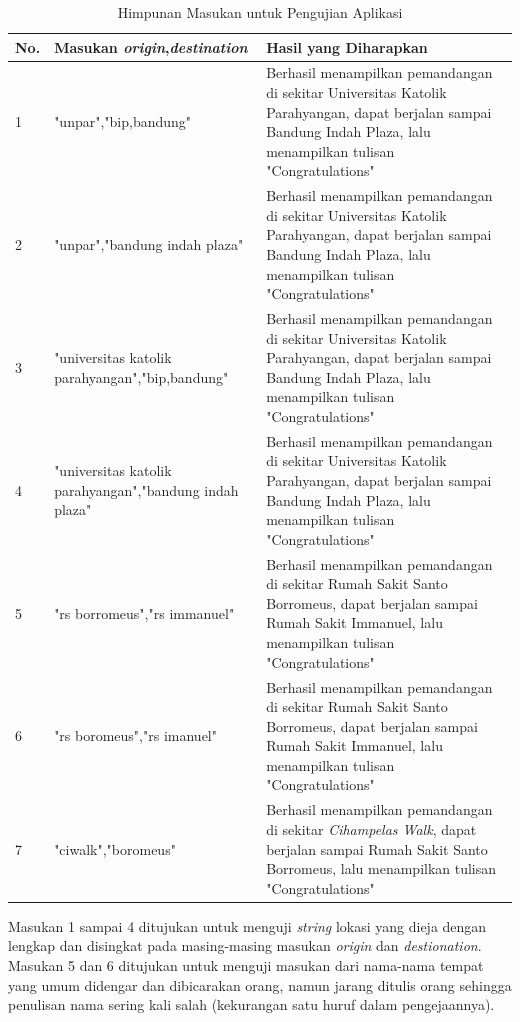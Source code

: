 \begin{table}[]
    \centering
    \caption{Himpunan Masukan untuk Pengujian Aplikasi}
    \begin{tabular}{|p{3cm}||p{5cm}|p{7cm}|}
    \hline
       No. & Masukan \textit{origin},\textit{destination}  & Hasil yang Diharapkan\\
    \hline  \hline
     1 & "unpar","bip,bandung"   & Berhasil menampilkan pemandangan di sekitar Universitas Katolik Parahyangan, dapat berjalan sampai Bandung Indah Plaza, lalu menampilkan tulisan "Congratulations"\\ \hline
     2 & "unpar","bandung indah plaza" & 
     Berhasil menampilkan pemandangan di sekitar Universitas Katolik Parahyangan, dapat berjalan sampai Bandung Indah Plaza, lalu menampilkan tulisan "Congratulations"\\ 
     \hline
     3 & "universitas katolik parahyangan","bip,bandung" & Berhasil menampilkan pemandangan di sekitar Universitas Katolik Parahyangan, dapat berjalan sampai Bandung Indah Plaza, lalu menampilkan tulisan "Congratulations"\\    \hline
     4 & "universitas katolik parahyangan","bandung indah plaza" & Berhasil menampilkan pemandangan di sekitar Universitas Katolik Parahyangan, dapat berjalan sampai Bandung Indah Plaza, lalu menampilkan tulisan "Congratulations"\\ \hline
     5 & "rs borromeus","rs immanuel" & Berhasil menampilkan pemandangan di sekitar Rumah Sakit Santo Borromeus, dapat berjalan sampai Rumah Sakit Immanuel, lalu menampilkan tulisan "Congratulations"\\ \hline
     6 & "rs boromeus","rs imanuel" & Berhasil menampilkan pemandangan di sekitar Rumah Sakit Santo Borromeus, dapat berjalan sampai Rumah Sakit Immanuel, lalu menampilkan tulisan "Congratulations" \\ \hline
     7 & "ciwalk","boromeus" & Berhasil menampilkan pemandangan di sekitar \textit{Cihampelas Walk}, dapat berjalan sampai Rumah Sakit Santo Borromeus, lalu menampilkan tulisan "Congratulations" \\
     \hline
    \end{tabular}
    \label{tab:input-test}
\end{table}

Masukan 1 sampai 4 ditujukan untuk menguji \textit{string} lokasi yang dieja dengan lengkap dan disingkat pada masing-masing masukan \textit{origin} dan \textit{destionation}. Masukan 5 dan 6 ditujukan untuk menguji masukan dari nama-nama tempat yang umum didengar dan dibicarakan orang, namun jarang ditulis orang sehingga penulisan nama sering kali salah (kekurangan satu huruf dalam pengejaannya).

